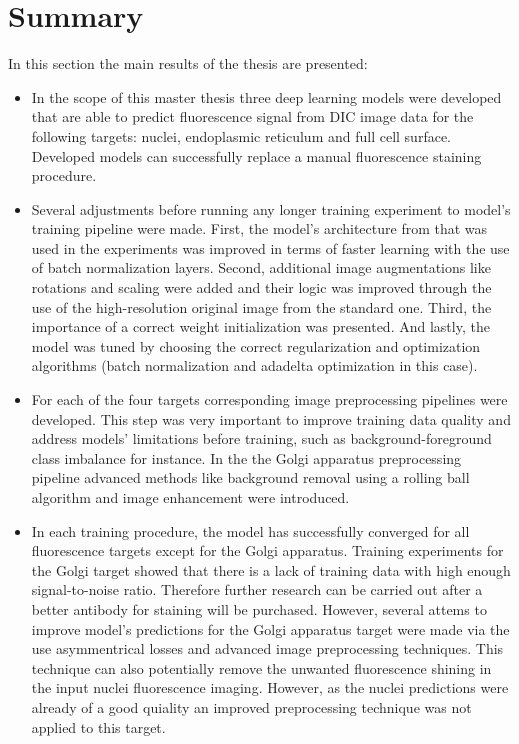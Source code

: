 \section{Summary}
In this section the main results of the thesis are presented:

\begin{itemize}
    \item In the scope of this master thesis three deep learning models were developed that are able to predict fluorescence signal from DIC image data for the following targets: nuclei, endoplasmic reticulum and full cell surface. Developed models can successfully replace a manual fluorescence staining procedure. 
    
    \item Several adjustments before running any longer training experiment to model's training pipeline were made. First, the model's architecture from \cite{Lachance_2020} that was used in the experiments was improved in terms of faster learning with the use of batch normalization layers. Second, additional image augmentations like rotations and scaling were added and their logic was improved through the use of the high-resolution original image from the standard one. Third, the importance of a correct weight initialization was presented. And lastly, the model was tuned by choosing the correct regularization and optimization algorithms (batch normalization and adadelta optimization in this case). 
    
    \item For each of the four targets corresponding image preprocessing pipelines were developed. This step was very important to improve training data quality and address models' limitations before training, such as background-foreground class imbalance for instance. In the the Golgi apparatus preprocessing pipeline advanced methods like background removal using a rolling ball algorithm and image enhancement were introduced.
    
    \item In each training procedure, the model has successfully converged for all fluorescence targets except for the Golgi apparatus. Training experiments for the Golgi target showed that there is a lack of training data with high enough signal-to-noise ratio. Therefore further research can be carried out after a better antibody for staining will be purchased. However, several attems to improve model's predictions for the Golgi apparatus target were made via the use asymmentrical losses and advanced image preprocessing techniques. This technique can also potentially remove the unwanted fluorescence shining in the input nuclei fluorescence imaging. However, as the nuclei predictions were already of a good quiality an improved preprocessing technique was not applied to this target. 
    

\end{itemize}

